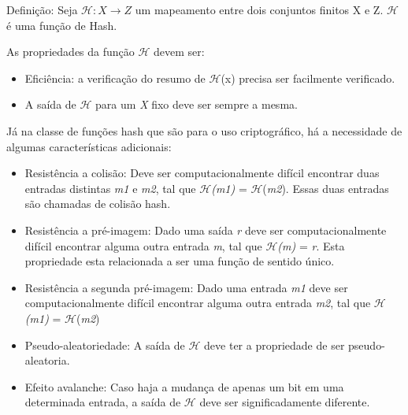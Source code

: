 \documentclass{ufsctex/ufsctex}
\begin{document}
Definição: Seja $\mathcal{H} : X \longrightarrow Z$ um mapeamento entre dois
conjuntos finitos X e Z. $\mathcal{H}$  é uma função de Hash.

As propriedades da função $\mathcal{H}$ devem ser:

\begin{itemize}

	\item Eficiência: a verificação do resumo de $\mathcal{H}$(x) precisa ser
	facilmente verificado.
	\item A saída de $\mathcal{H}$ para um \textit{X} fixo deve ser sempre a
		mesma.

\end{itemize}

Já na classe de funções hash que são para o uso criptográfico, há a necessidade
de algumas características adicionais:

\begin{itemize}

	\item Resistência a colisão: Deve ser computacionalmente difícil encontrar
		duas entradas distintas \textit{m1} e \textit{m2}, tal que
		$\mathcal{H}$\textit{(m1)} = $\mathcal{H}$(\textit{m2}). Essas duas
		entradas são chamadas de colisão hash.
	\item Resistência a pré-imagem: Dado uma saída \textit{r} deve ser
		computacionalmente difícil encontrar alguma outra entrada \textit{m},
		tal que $\mathcal{H}$\textit{(m)} = \textit{r}. Esta propriedade esta
		relacionada a ser uma função de sentido único.
	\item Resistência a segunda pré-imagem: Dado uma entrada \textit{m1} deve
		ser computacionalmente difícil encontrar alguma outra entrada
		\textit{m2}, tal que $\mathcal{H}$\textit{(m1)} =
		$\mathcal{H}$(\textit{m2})
	\item Pseudo-aleatoriedade: A saída de $\mathcal{H}$ deve ter a propriedade
		de ser pseudo-aleatoria.
	\item Efeito avalanche: Caso haja a mudança de apenas um bit em uma
		determinada entrada, a saída de $\mathcal{H}$ deve ser significadamente
		diferente.

\end{itemize}
\end{document}
